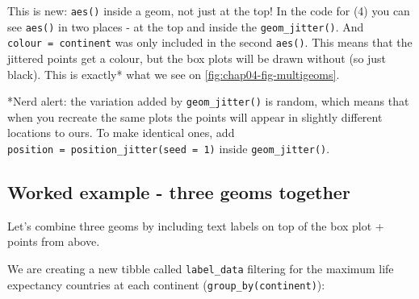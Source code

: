 \documentclass[
  12pt,
  krantz2]{krantz}
\makeatletter
\newenvironment{Shaded}{\begin{snugshade}}{\end{snugshade}}
\newcommand{\CommentTok}[1]{\textcolor[rgb]{0.56,0.35,0.01}{\textit{#1}}}
\newcommand{\DataTypeTok}[1]{\textcolor[rgb]{0.13,0.29,0.53}{#1}}
\newcommand{\KeywordTok}[1]{\textcolor[rgb]{0.13,0.29,0.53}{\textbf{#1}}}
\newcommand{\NormalTok}[1]{#1}
\newcommand{\OperatorTok}[1]{\textcolor[rgb]{0.81,0.36,0.00}{\textbf{#1}}}
\newcommand{\StringTok}[1]{\textcolor[rgb]{0.31,0.60,0.02}{#1}}
\newenvironment{kframe}{%
\medskip{}
\setlength{\fboxsep}{.8em}
 \def\at@end@of@kframe{}%
 \ifinner\ifhmode%
  \def\at@end@of@kframe{\end{minipage}}%
  \begin{minipage}{\columnwidth}%
 \fi\fi%
 \def\FrameCommand##1{\hskip\@totalleftmargin \hskip-\fboxsep
 \colorbox{shadecolor}{##1}\hskip-\fboxsep
     \hskip-\linewidth \hskip-\@totalleftmargin \hskip\columnwidth}%
 \MakeFramed {\advance\hsize-\width
   \@totalleftmargin\z@ \linewidth\hsize
   \@setminipage}}%
 {\par\unskip\endMakeFramed%
 \at@end@of@kframe}
\renewenvironment{Shaded}{\begin{kframe}}{\end{kframe}}
\makeatother
\begin{document}
\begin{Shaded}
\end{Shaded}

This is new: \texttt{aes()} inside a geom, not just at the top!
In the code for (4) you can see \texttt{aes()} in two places - at the top and inside the \texttt{geom\_jitter()}.
And \texttt{colour\ =\ continent} was only included in the second \texttt{aes()}.
This means that the jittered points get a colour, but the box plots will be drawn without (so just black).
This is exactly* what we see on \ref{fig:chap04-fig-multigeoms}.

*Nerd alert: the variation added by \texttt{geom\_jitter()} is random, which means that when you recreate the same plots the points will appear in slightly different locations to ours. To make identical ones, add \texttt{position\ =\ position\_jitter(seed\ =\ 1)} inside \texttt{geom\_jitter()}.

\hypertarget{worked-example---three-geoms-together}{%
\subsection{Worked example - three geoms together}\label{worked-example---three-geoms-together}}

Let's combine three geoms by including text labels on top of the box plot + points from above.

We are creating a new tibble called \texttt{label\_data} filtering for the maximum life expectancy countries at each continent (\texttt{group\_by(continent)}):
\end{document}
